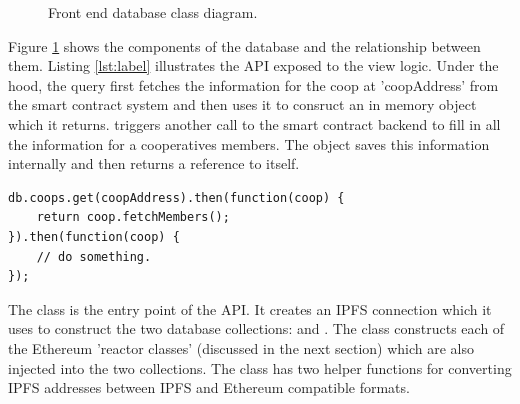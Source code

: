 \begin{figure}
\centering
{}
\decoRule
\caption[Front End Database Alass Diagram]{Front end database class diagram.}
\label{fig:dbClassDiagram}
\end{figure}

Figure \ref{fig:dbClassDiagram} shows the components of the database and the relationship between them. Listing \ref{lst:label} illustrates the API exposed to the view logic. Under the hood, the query first fetches the information for the coop at 'coopAddress' from the smart contract system and then uses it to consruct an in memory  object which it returns.  triggers another call to the smart contract backend to fill in all the information for a cooperatives members. The  object saves this information internally and then returns a reference to itself. \\

\begin{lstlisting}[caption={Example query to the front end database api}, label={lst:label}]
db.coops.get(coopAddress).then(function(coop) {
	return coop.fetchMembers();
}).then(function(coop) {
	// do something.
});
\end{lstlisting}

The  class is the entry point of the API. It creates an IPFS connection which it uses to construct the two database collections:  and . The  class constructs each of the Ethereum 'reactor classes' (discussed in the next section) which are also injected into the two collections. The  class has two helper functions for converting IPFS addresses between IPFS and Ethereum compatible formats.\\

